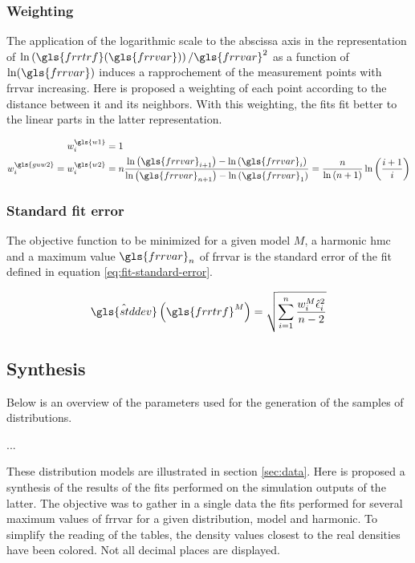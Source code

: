 \subsubsection{Weighting}
The application of the logarithmic scale to the abscissa axis in the representation of \( \ln \left( \gls{frrtrf}(\gls{frrvar}) \right) / \gls{frrvar}^2 \) as a function of \( \ln(\gls{frrvar}) \) induces a rapprochement of the measurement points with \gls{frrvar} increasing.
Here is proposed a weighting of each point according to the distance between it and its neighbors.
With this weighting, the fits fit better to the linear parts in the latter representation.

\begin{align}
w^{\gls{w1}}_i &= 1 \\
w^{\gls{guw2}}_i = w^{\gls{w2}}_i &=
n
\frac{
\ln \left(\gls{frrvar}_{i + 1} \right) - \ln \left(\gls{frrvar}_i\right)
}{
\ln \left(\gls{frrvar}_{n + 1} \right) - \ln \left(\gls{frrvar}_1\right)
} =
\frac{n}{\ln \left( n + 1 \right)} \ln \left( \frac{i+1}{i} \right)
\end{align}

\subsubsection{Standard fit error}
The objective function to be minimized for a given model \( M \), a harmonic \gls{hmc} and a maximum value \( \gls{frrvar}_n \) of \gls{frrvar} is the standard error of the fit defined in equation \eqref{eq:fit-standard-error}.

\begin{equation}\label{eq:fit-standard-error}
\hat{\gls{stddev}} \left( \gls{frrtrf}^M \right) = \sqrt{\sum_{i=1}^n \frac{w^M_i\hat{\epsilon}_i^2}{n-2}}
\end{equation}

\subsection{Synthesis}\label{sec:synthesis}

Below is an overview of the parameters used for the generation of the samples of distributions.

...

\bigskip

These distribution models are illustrated in section \ref{sec:data}.
Here is proposed a synthesis of the results of the fits performed on the simulation outputs of the latter.
The objective was to gather in a single data the fits performed for several maximum values of \gls{frrvar} for a given distribution, model and harmonic.
To simplify the reading of the tables, the density values closest to the real densities have been colored.
Not all decimal places are displayed.



